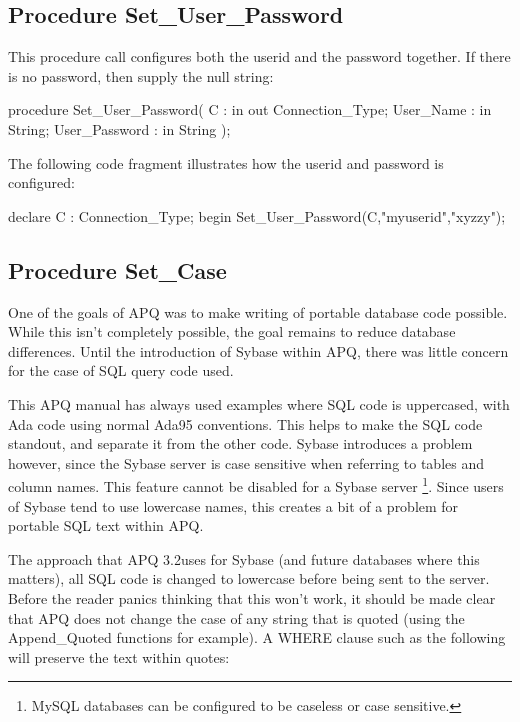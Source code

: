 \documentclass[english,letterpaper]{book}
\newcommand\apqversion{3.2}
\begin{document}
\subsection{Procedure Set\_User\_Password}

This procedure call configures both the userid and the password together.
If there is no password, then supply the null string:

\begin{Code}
procedure Set_User_Password(
   C :             in out Connection_Type;
   User_Name :     in     String;
   User_Password : in     String
);
\end{Code}

The following code fragment illustrates how the userid and
password is configured:

\begin{Example}
declare
   C :   Connection_Type;
begin
   Set_User_Password(C,"myuserid","xyzzy");
\end{Example}

\subsection{Procedure Set\_Case}

One of the goals of APQ was to make writing of portable database code
possible. While this isn't completely possible, the goal remains to
reduce database differences. Until the introduction of Sybase within
APQ, there was little concern for the case of SQL query code used. 

This APQ manual has always used examples where SQL code is uppercased,
with Ada code using normal Ada95 conventions. This helps to make the
SQL code standout, and separate it from the other code. Sybase introduces
a problem however, since the Sybase server is case sensitive when
referring to tables and column names. This feature cannot be disabled
for a Sybase server%
\footnote{MySQL databases can be configured to be caseless or case sensitive.%
}. Since users of Sybase tend to use lowercase names, this creates
a bit of a problem for portable SQL text within APQ.

The approach that APQ \apqversion uses for Sybase (and future databases where
this matters), all SQL code is changed to lowercase before being
sent to the server. Before the reader panics thinking that this won't
work, it should be made clear that APQ does not change the case of
any string that is quoted (using the Append\_Quoted functions for
example). A WHERE clause such as the following will preserve the text
within quotes:
\end{document}
